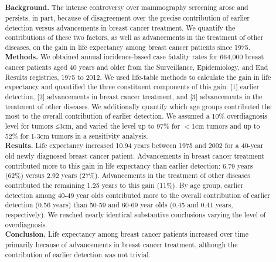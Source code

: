 \documentclass[11pt,letterpaper]{article}
\theoremstyle{plain}
\theoremstyle{remark}
\numberwithin{equation}{section}
\begin{document}
 \begin{abstract}

   \textbf{Background.}  The intense controversy over mammography
   screening arose and persists, in part, because of disagreement over
   the precise contribution of earlier detection versus advancements
   in breast cancer treatment.  We quantify the contributions of these
   two factors, as well as advancements in the treatment of other
   diseases, on the gain in life expectancy among breast cancer
   patients since 1975.\\

   \textbf{Methods.}  We obtained annual incidence-based case fatality
   rates for 664,000 breast cancer patients aged 40 years and older
   from the Surveillance, Epidemiology, and End Results registries,
   1975 to 2012.  We used life-table methods to calculate the gain in
   life expectancy and quantified the three constituent components of
   this gain: [1] earlier detection, [2] advancements in breast cancer
   treatment, and [3] advancements in the treatment of other diseases.
   We additionally quantify which age groups contributed the most to
   the overall contribution of earlier detection.  We assumed a 10\%
   overdiagnosis level for tumors ≤3cm, and varied the level up to
   97\% for $<$1cm tumors and up to 52\% for 1-3cm tumors in a
   sensitivity analysis.\\

   \textbf{Results.}  Life expectancy increased 10.94 years between
   1975 and 2002 for a 40-year old newly diagnosed breast cancer
   patient.  Advancements in breast cancer treatment contributed more
   to this gain in life expectancy than earlier detection: 6.79 years
   (62\%) versus 2.92 years (27\%).  Advancements in the treatment of
   other diseases contributed the remaining 1.25 years to this gain
   (11\%).  By age group, earlier detection among 40-49 year olds
   contributed more to the overall contribution of earlier detection
   (0.56 years) than 50-59 and 60-69 year olds (0.45 and 0.41 years,
   respectively).  We reached nearly identical substantive conclusions
   varying the level of overdiagnosis.\\
   
   \textbf{Conclusion.}  Life expectancy among breast cancer patients
   increased over time primarily because of advancements in breast
   cancer treatment, although the contribution of earlier detection
   was not trivial.


\end{abstract}
\blind \title{\bf \tit} \maketitle \fi
\end{document}
